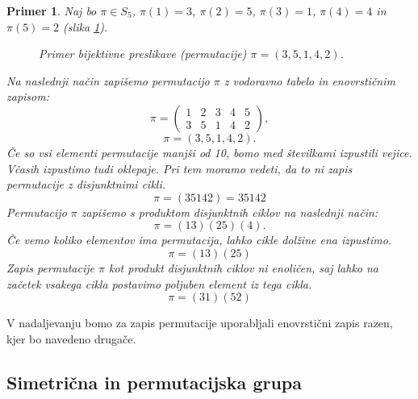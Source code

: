 \documentclass[a4paper, 12pt]{book}
\newtheorem{primer}{Primer}[chapter]
\begin{document}
\begin{primer}
    Naj bo $\pi \in S_5$, $\pi(1) = 3$, $\pi(2) = 5$, $\pi(3) = 1$, $\pi(4) = 4$ in $\pi(5) = 2$ (slika \ref{bijektivna_preslikava_n_n}). 
    \begin{figure}[h]
        \begin{center}        
        \end{center}
        \caption{Primer bijektivne preslikave (permutacije) $\pi = (3, 5, 1, 4, 2)$.}
        \label{bijektivna_preslikava_n_n}
    \end{figure}
    Na naslednji način zapišemo permutacijo $\pi$ z vodoravno tabelo in enovrstičnim zapisom:
    \[
        \pi = \begin{pmatrix}
            1 & 2 & 3 & 4 & 5 \\
            3 & 5 & 1 & 4 & 2
        \end{pmatrix},
    \]
    \[
        \pi = (3, 5, 1, 4, 2).
    \]
    Če so vsi elementi permutacije manjši od 10, bomo med številkami izpustili vejice. Včasih izpustimo tudi oklepaje. Pri tem moramo vedeti, da to ni zapis permutacije z disjunktnimi cikli.
    \[
        \pi = (3 5 1 4 2) = 35142
    \]
    Permutacijo $\pi$ zapišemo s produktom disjunktnih ciklov na naslednji način:
    \[
        \pi = (1 3)(2 5)(4).
    \]
    Če vemo koliko elementov ima permutacija, lahko cikle dolžine ena izpustimo. 
    \[
        \pi = (1 3)(2 5)
    \]
    Zapis permutacije $\pi$ kot produkt disjunktnih ciklov ni enoličen, saj lahko na začetek vsakega cikla postavimo poljuben element iz tega cikla.
    \[
        \pi = (3 1)(5 2)
    \]
\end{primer}

V nadaljevanju bomo za zapis permutacije uporabljali enovrstični zapis razen, kjer bo navedeno drugače.

\subsection{ Simetrična in permutacijska grupa }
\end{document}
